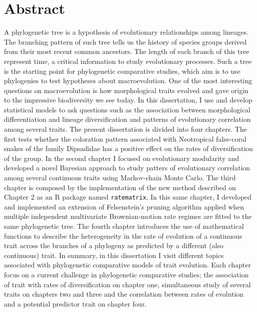 \section*{\large{Abstract}}

A phylogenetic tree is a hypothesis of evolutionary relationships among lineages. The branching pattern of such tree tells us the history of species groups derived from their most recent common ancestors. The length of each branch of this tree represent time, a critical information to study evolutionary processes. Such a tree is the starting point for phylogenetic comparative studies, which aim is to use phylogenies to test hypotheses about macroevolution. One of the most interesting questions on macroevolution is how morphological traits evolved and gave origin to the impressive biodiversity we see today. In this dissertation, I use and develop statistical models to ask questions such as the association between morphological differentiation and lineage diversification and patterns of evolutionary correlation among several traits. The present dissertation is divided into four chapters. The first tests whether the coloration pattern associated with Neotropical false-coral snakes of the family Dipsadidae has a positive effect on the rates of diversification of the group. In the second chapter I focused on evolutionary modularity and developed a novel Bayesian approach to study patters of evolutionary correlation among several continuous traits using Markov-chain Monte Carlo. The third chapter is composed by the implementation of the new method described on Chapter 2 as an R package named \texttt{ratematrix}. In this same chapter, I developed and implemented an extension of Felsenstein's pruning algorithm applied when multiple independent multivariate Brownian-motion rate regimes are fitted to the same phylogenetic tree. The fourth chapter introduces the use of mathematical functions to describe the heterogeneity in the rate of evolution of a continuous trait across the branches of a phylogeny as predicted by a different (also continuous) trait. In summary, in this dissertation I visit different topics associated with phylogenetic comparative models of trait evolution. Each chapter focus on a current challenge in phylogenetic comparative studies; the association of trait with rates of diversification on chapter one, simultaneous study of several traits on chapters two and three and the correlation between rates of evolution and a potential predictor trait on chapter four.

